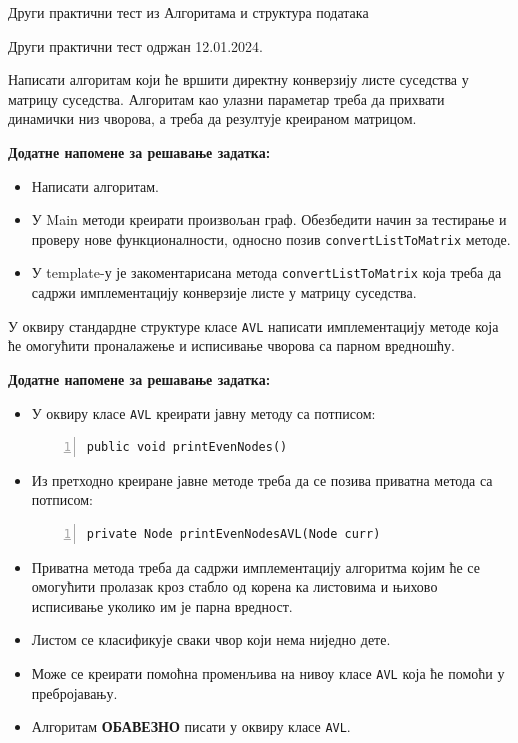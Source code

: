 
Други практични тест из Алгоритама и структура података

Други практични тест одржан 12.01.2024.

Написати алгоритам који ће вршити директну конверзију листе суседства у матрицу суседства. Алгоритам као улазни параметар треба да прихвати динамички низ чворова, а треба да резултује креираном матрицом.

\textbf{Додатне напомене за решавање задатка:}
\begin{itemize}
	\item Написати алгоритам.
	\item У Main методи креирати произвољан граф. Обезбедити начин за тестирање и проверу нове функционалности, односно позив \texttt{convertListToMatrix} методе.
	\item У template-у је закоментарисана метода \texttt{convertListToMatrix} која треба да садржи имплементацију конверзије листе у матрицу суседства.
\end{itemize}



У оквиру стандардне структуре класе \texttt{AVL} написати имплементацију методе која ће омогућити проналажење и исписивање чворова са парном вредношћу.

\textbf{Додатне напомене за решавање задатка:}
\begin{itemize}
	\item У оквиру класе \texttt{AVL} креирати јавну методу са потписом:
	\begin{Verbatim}[fontsize=\footnotesize, numbers=left, xleftmargin=10mm]
public void printEvenNodes()
	\end{Verbatim}
	\item Из претходно креиране јавне методе треба да се позива приватна метода са потписом:
	\begin{Verbatim}[fontsize=\footnotesize, numbers=left, xleftmargin=10mm]
private Node printEvenNodesAVL(Node curr)
	\end{Verbatim}
	\item Приватна метода треба да садржи имплементацију алгоритма којим ће се омогућити пролазак кроз стабло од корена ка листовима и њихово исписивање уколико им је парна вредност.
	\item Листом се класификује сваки чвор који нема ниједно дете.
	\item Може се креирати помоћна променљива на нивоу класе \texttt{AVL} која ће помоћи у пребројавању.
	\item Алгоритам \textbf{ОБАВЕЗНО} писати у оквиру класе \texttt{AVL}.
\end{itemize}

